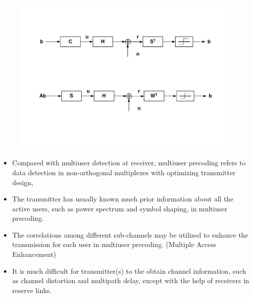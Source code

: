 \documentclass[20pt,landscape]{foils}
\begin{document}
\begin{figure}
\begin{center}
\includegraphics[width=7.0in]{SystemModels.pdf}
\end{center}
\end{figure}


\begin{itemize}
\item Compared with multiuser detection at receiver, multiuser
precoding refers to data detection in non-orthogonal multiplexes
with optimizing transmitter design,

\item The transmitter has usually known much prior information
about all the active users, such as power spectrum and symbol
shaping, in multiuser precoding.

\item The correlations among different sub-channels may be
utilized to enhance the transmission for each user in multiuser
precoding. (Multiple Access Enhancement)

\item It is much difficult for transmitter(s) to the obtain
channel information, such as channel distortion and multipath
delay, except with the help of receivers in reserve links.
\end{itemize}
\end{document}

